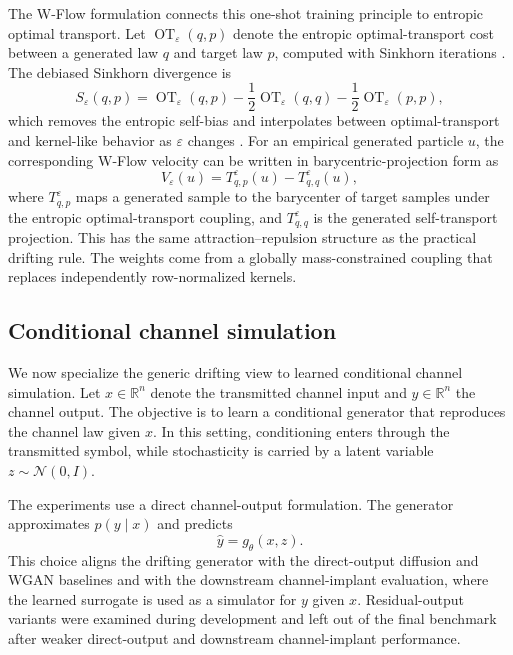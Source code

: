\documentclass[10pt,journal]{IEEEtran}
\begin{document}
The W-Flow formulation \cite{han2026wflow} connects this one-shot training principle to entropic optimal transport.
Let \(\operatorname{OT}_{\varepsilon}(q,p)\) denote the entropic optimal-transport cost between a generated law \(q\) and target law \(p\), computed with Sinkhorn iterations \cite{cuturi2013sinkhorn}.
The debiased Sinkhorn divergence is
\begin{equation}
S_{\varepsilon}(q,p)
=
\operatorname{OT}_{\varepsilon}(q,p)
-\frac{1}{2}\operatorname{OT}_{\varepsilon}(q,q)
-\frac{1}{2}\operatorname{OT}_{\varepsilon}(p,p),
\end{equation}
which removes the entropic self-bias and interpolates between optimal-transport and kernel-like behavior as \(\varepsilon\) changes \cite{feydy2019sinkhorn}.
For an empirical generated particle \(u\), the corresponding W-Flow velocity can be written in barycentric-projection form as
\begin{equation}
V_{\varepsilon}(u)
=
T^{\varepsilon}_{q,p}(u)
-
T^{\varepsilon}_{q,q}(u),
\label{eq:wflow_velocity}
\end{equation}
where \(T^{\varepsilon}_{q,p}\) maps a generated sample to the barycenter of target samples under the entropic optimal-transport coupling, and \(T^{\varepsilon}_{q,q}\) is the generated self-transport projection.
This has the same attraction--repulsion structure as the practical drifting rule.
The weights come from a globally mass-constrained coupling that replaces independently row-normalized kernels.

\subsection{Conditional channel simulation}
We now specialize the generic drifting view to learned conditional channel simulation.
Let \(x \in \mathbb{R}^n\) denote the transmitted channel input and \(y \in \mathbb{R}^n\) the channel output.
The objective is to learn a conditional generator that reproduces the channel law given \(x\).
In this setting, conditioning enters through the transmitted symbol, while stochasticity is carried by a latent variable \(z \sim \mathcal{N}(0, I)\).

The experiments use a direct channel-output formulation.
The generator approximates \(p(y \mid x)\) and predicts
\begin{equation}
\hat{y} = g_\theta(x,z).
\end{equation}
This choice aligns the drifting generator with the direct-output diffusion and WGAN baselines and with the downstream channel-implant evaluation, where the learned surrogate is used as a simulator for \(y\) given \(x\).
Residual-output variants were examined during development and left out of the final benchmark after weaker direct-output and downstream channel-implant performance.
\end{document}
